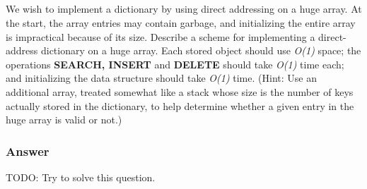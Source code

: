     \subsection {}

    We wish to implement a dictionary by using direct addressing on a huge
    array. At the start, the array entries may contain garbage, and
    initializing the entire array is impractical because of its size. Describe
    a scheme for implementing a direct-address dictionary on a huge array. Each
    stored object should use \textit{O(1)} space; the operations
    \textbf{SEARCH, INSERT} and \textbf{DELETE} should take \textit{O(1)} time
    each; and initializing the data structure should take \textit{O(1)} time.
    (Hint: Use an additional array, treated somewhat like a stack whose size is
    the number of keys actually stored in the dictionary, to help determine
    whether a given entry in the huge array is valid or not.)

      \subsubsection {Answer}
      TODO: Try to solve this question.
